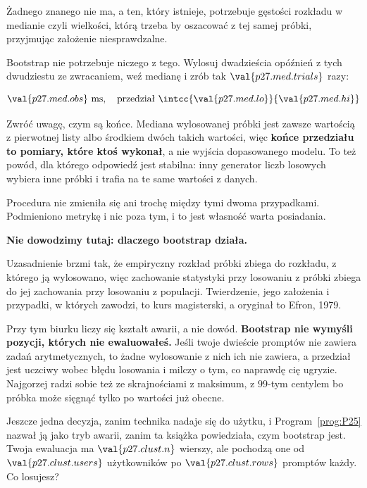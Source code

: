 \begin{fr}
\begin{ansblock}
Żadnego znanego nie ma, a ten, który istnieje, potrzebuje gęstości rozkładu w
medianie \dash{} czyli wielkości, którą trzeba by oszacować z tej samej próbki,
przyjmując założenie niesprawdzalne.
\end{ansblock}

Bootstrap nie potrzebuje niczego z tego. Wylosuj dwadzieścia opóźnień z tych
dwudziestu ze zwracaniem, weź medianę i zrób tak $\val{p27.med.trials}$ razy:

\[ \val{p27.med.obs}\ \text{ms}, \quad
   \text{przedział } \intcc{\val{p27.med.lo}}{\val{p27.med.hi}} \]

Zwróć uwagę, czym są końce. Mediana wylosowanej próbki jest zawsze wartością z
pierwotnej listy albo środkiem dwóch takich wartości, więc \textbf{końce
przedziału to pomiary, które ktoś wykonał}, a nie wyjścia dopasowanego modelu.
To też powód, dla którego odpowiedź jest stabilna: inny generator liczb
losowych wybiera inne próbki i trafia na te same wartości z danych.

Procedura nie zmieniła się ani trochę między tymi dwoma przypadkami.
Podmieniono metrykę i nic poza tym, i to jest własność warta posiadania.
\end{fr}

\begin{fr}
\begin{rigourbox}
\textbf{Nie dowodzimy tutaj: dlaczego bootstrap działa.}

Uzasadnienie brzmi tak, że empiryczny rozkład próbki zbiega do rozkładu, z
którego ją wylosowano, więc zachowanie statystyki przy losowaniu z próbki
zbiega do jej zachowania przy losowaniu z populacji. Twierdzenie, jego
założenia i przypadki, w których zawodzi, to kurs magisterski, a oryginał to
Efron, 1979.

Przy tym biurku liczy się kształt awarii, a nie dowód. \textbf{Bootstrap nie
wymyśli pozycji, których nie ewaluowałeś.} Jeśli twoje dwieście promptów nie
zawiera zadań arytmetycznych, to żadne wylosowanie z nich ich nie zawiera, a
przedział jest uczciwy wobec błędu losowania i milczy o tym, co naprawdę cię
ugryzie. Najgorzej radzi sobie też ze skrajnościami \dash{} z maksimum, z
$99$-tym centylem \dash{} bo próbka może sięgnąć tylko po wartości już obecne.
\end{rigourbox}

Jeszcze jedna decyzja, zanim technika nadaje się do użytku, i
Program~\ref{prog:P25} nazwał ją jako tryb awarii, zanim ta książka
powiedziała, czym bootstrap jest. Twoja ewaluacja ma $\val{p27.clust.n}$
wierszy, ale pochodzą one od $\val{p27.clust.users}$ użytkowników po
$\val{p27.clust.rows}$ promptów każdy. Co losujesz?
\dotline
\nextframe
\end{fr}

